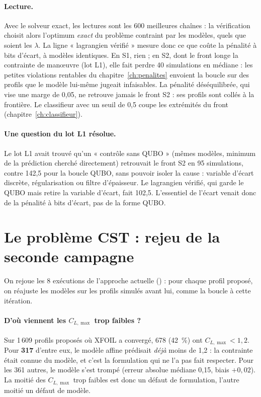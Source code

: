 \paragraph{Lecture.} Avec le solveur exact, les lectures sont les 600 meilleures chaînes : la vérification choisit alors l'optimum \emph{exact} du problème contraint par les modèles, quels que soient les $\lambda$. La ligne « lagrangien vérifié » mesure donc ce que coûte la pénalité à bits d'écart, à modèles identiques. En S1, rien ; en S2, dont le front longe la contrainte de manœuvre (lot L1), elle fait perdre 40 simulations en médiane : les petites violations rentables du chapitre~\ref{ch:penalites} envoient la boucle sur des profils que le modèle lui-même jugeait infaisables. La pénalité déséquilibrée, qui vise une marge de 0,05, ne retrouve jamais le front S2 : ses profils sont collés à la frontière. Le classifieur avec un seuil de 0,5 coupe les extrémités du front (chapitre~\ref{ch:classifieur}).

\paragraph{Une question du lot L1 résolue.} Le lot L1 avait trouvé qu'un « contrôle sans QUBO » (mêmes modèles, minimum de la prédiction cherché directement) retrouvait le front S2 en 95 simulations, contre 142,5 pour la boucle QUBO, sans pouvoir isoler la cause : variable d'écart discrète, régularisation ou filtre d'épaisseur. Le lagrangien vérifié, qui garde le QUBO mais retire la variable d'écart, fait 102,5. L'essentiel de l'écart venait donc de la pénalité à bits d'écart, pas de la forme QUBO.

\section{Le problème CST : rejeu de la seconde campagne}
On rejoue les 8 exécutions de l'approche actuelle () : pour chaque profil proposé, on réajuste les modèles sur les profils simulés avant lui, comme la boucle à cette itération.

\paragraph{D'où viennent les $C_{L,\max}$ trop faibles ?} Sur 1\,609 profils proposés où XFOIL a convergé, 678 (42~\%) ont $C_{L,\max}<1{,}2$. Pour \textbf{317} d'entre eux, le modèle affine prédisait \emph{déjà} moins de 1,2 : la contrainte était connue du modèle, et c'est la formulation qui ne l'a pas fait respecter. Pour les 361 autres, le modèle s'est trompé (erreur absolue médiane 0,15, biais $+0{,}02$). La moitié des $C_{L,\max}$ trop faibles est donc un défaut de formulation, l'autre moitié un défaut de modèle.

